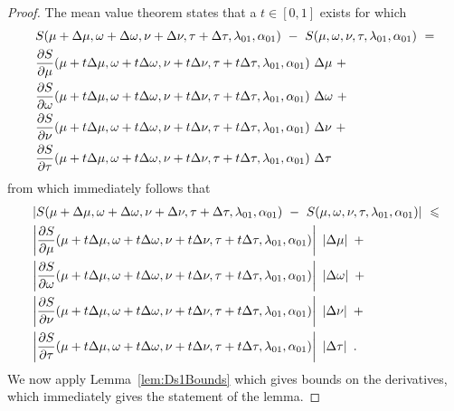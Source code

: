\documentclass{article}
\renewcommand{\leq}{\leqslant}
\begin{document}
\begin{proof}


The mean value theorem states that a $t\in[0,1]$ exists for
which
\begin{align}
&S(\mu + \Delta \mu,\omega + \Delta \omega,\nu + \Delta
  \nu,\tau + \Delta \tau,\lambda_{\rm 01},\alpha_{\rm 01}) 
\ - \ 
S(\mu,\omega,\nu,\tau,\lambda_{\rm 01},\alpha_{\rm 01}) \ = \\ \nonumber
&\frac{\partial S}{\partial \mu}(\mu + t\Delta \mu,\omega + t\Delta \omega,\nu + t\Delta
  \nu,\tau + t\Delta \tau,\lambda_{\rm 01},\alpha_{\rm 01}) \ \Delta \mu
\ + \\ \nonumber
&\frac{\partial S}{\partial \omega}(\mu + t\Delta \mu,\omega + t\Delta \omega,\nu + t\Delta
  \nu,\tau + t\Delta \tau,\lambda_{\rm 01},\alpha_{\rm 01}) \ \Delta \omega
\ + \\ \nonumber
&\frac{\partial S}{\partial \nu}(\mu + t\Delta \mu,\omega + t\Delta \omega,\nu + t\Delta
  \nu,\tau + t\Delta \tau,\lambda_{\rm 01},\alpha_{\rm 01})\ \Delta
  \nu
\ + \\ \nonumber
&\frac{\partial S}{\partial \tau}(\mu + t\Delta \mu,\omega + t\Delta \omega,\nu + t\Delta
  \nu,\tau + t\Delta \tau,\lambda_{\rm 01},\alpha_{\rm 01})\
  \Delta \tau 
\end{align}
from which immediately follows that
\begin{align}
&\left|S(\mu + \Delta \mu,\omega + \Delta \omega,\nu + \Delta
  \nu,\tau + \Delta \tau,\lambda_{\rm 01},\alpha_{\rm 01}) 
\ - \ 
S(\mu,\omega,\nu,\tau,\lambda_{\rm 01},\alpha_{\rm 01})\right| \ \leq \\ \nonumber
&\left|\frac{\partial S}{\partial \mu}(\mu + t\Delta \mu,\omega + t\Delta \omega,\nu + t\Delta
  \nu,\tau + t\Delta \tau,\lambda_{\rm 01},\alpha_{\rm 01})\right| \ \left|\Delta \mu\right|
\ + \\ \nonumber
&\left|\frac{\partial S}{\partial \omega}(\mu + t\Delta \mu,\omega + t\Delta \omega,\nu + t\Delta
  \nu,\tau + t\Delta \tau,\lambda_{\rm 01},\alpha_{\rm 01})\right| \ \left|\Delta \omega\right|
\ + \\ \nonumber
&\left|\frac{\partial S}{\partial \nu}(\mu + t\Delta \mu,\omega + t\Delta \omega,\nu + t\Delta
  \nu,\tau + t\Delta
  \tau,\lambda_{\rm 01},\alpha_{\rm 01})\right|\ \left|\Delta \nu\right|
\ + \\ \nonumber
&\left|\frac{\partial S}{\partial \tau}(\mu + t\Delta \mu,\omega + t\Delta \omega,\nu + t\Delta
  \nu,\tau + t\Delta \tau,\lambda_{\rm 01},\alpha_{\rm 01})\right|\
  \left|\Delta \tau \right| \ .
\end{align}
We now apply Lemma~\ref{lem:Ds1Bounds} which gives bounds on the
derivatives, which immediately gives the statement of the lemma.
\end{proof}
\end{document}
